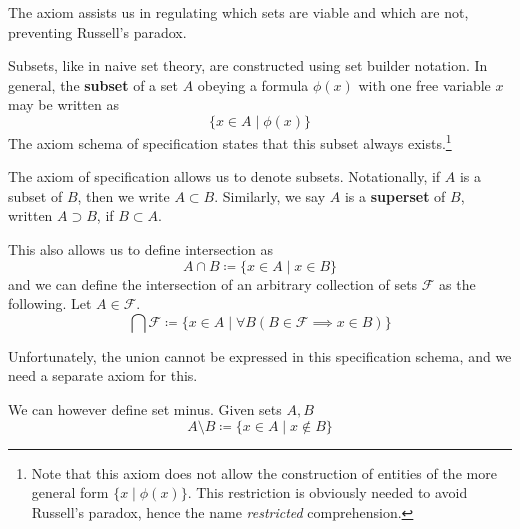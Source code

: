 \documentclass{article}
\begin{document}
    The axiom assists us in regulating which sets are viable and which are not, preventing Russell's paradox. 

    \begin{axiom}
      Subsets, like in naive set theory, are constructed using set builder notation. In general, the \textbf{subset} of a set $A$ obeying a formula $\phi(x)$ with one free variable $x$ may be written as 
      \begin{equation}
        \{x \in A \mid \phi(x) \}
      \end{equation}
      The axiom schema of specification states that this subset always exists.\footnote{Note that this axiom does not allow the construction of entities of the more general form $\{x \mid \phi(x)\}$. This restriction is obviously needed to avoid Russell's paradox, hence the name \textit{restricted} comprehension. } 
    \end{axiom}  

    \begin{definition}
      The axiom of specification allows us to denote subsets. Notationally, if $A$ is a subset of $B$, then we write $A \subset B$. Similarly, we say $A$ is a \textbf{superset} of $B$, written $A \supset B$, if $B \subset A$. 
    \end{definition} 
    
    \begin{definition}[Intersection]
      This also allows us to define intersection as 
      \begin{equation}
        A \cap B \coloneqq \{x \in A \mid x \in B \}
      \end{equation} 
      and we can define the intersection of an arbitrary collection of sets $\mathcal{F}$ as the following. Let $A \in \mathcal{F}$.  
      \begin{equation}
        \bigcap \mathcal{F} \coloneqq \{x \in A \mid \forall B (B \in \mathcal{F} \implies x \in B) \}
      \end{equation}
    \end{definition}

    Unfortunately, the union cannot be expressed in this specification schema, and we need a separate axiom for this. 

    \begin{definition}
      We can however define set minus. Given sets $A, B$
      \begin{equation}
        A \setminus B \coloneqq \{ x \in A \mid x \not\in B \}
      \end{equation}
    \end{definition}
\end{document}
